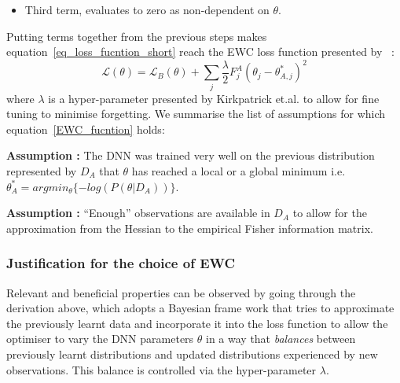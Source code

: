 \begin{itemize}
    \item Third term, evaluates to zero as non-dependent on $\theta$.
    
\end{itemize}

    

\noindent Putting terms together from the previous steps makes equation~\ref{eq_loss_fucntion_short} reach the EWC loss function presented by ~\cite{Kirkpatrick2017}: 
\begin{equation}\label{EWC_fucntion}
   \mathcal{L}(\theta) = \mathcal{L}_{B}(\theta) +  \sum_{j}^{} \frac{\lambda}{2} F^A_j (\theta_j - \theta^{*}_{A,j})^2
\end{equation}
where $\lambda$ is a hyper-parameter presented by Kirkpatrick et.al. to allow for fine tuning to minimise forgetting.
\noindent We summarise the list of assumptions for which equation~\ref{EWC_fucntion} holds:

\noindent\textbf{Assumption \assumptionEWCfirst:} The DNN was trained very well on the previous distribution represented by $D_A$ that $\theta$ has reached a local or a global minimum i.e. $\theta^{*}_{A} = argmin_{\theta}\{ -log(P(\theta|D_A))\}$. 

\noindent\textbf{Assumption \assumptionEWCsecond:} ``Enough'' observations are available in $D_A$ to allow for the approximation from the Hessian to the empirical Fisher information matrix.


\subsubsection{Justification for the choice of EWC}
Relevant and beneficial properties can be observed by going through the derivation above, which adopts a Bayesian frame work that  tries to approximate the previously learnt data and incorporate it into the loss function to allow the optimiser to vary the DNN parameters $\theta$ in a way that \textit{balances} between previously learnt distributions and updated distributions experienced by new observations. 
%
This balance is controlled via the hyper-parameter $\lambda$.

